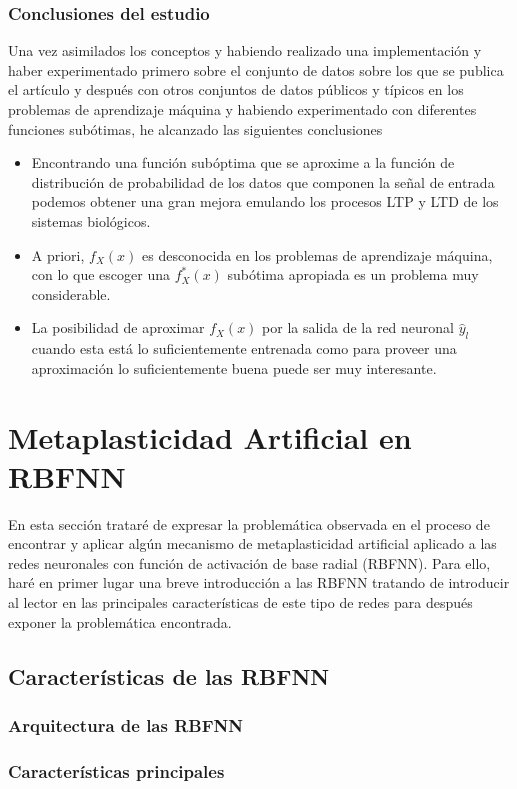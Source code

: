 \documentclass[10pt,a4paper]{report}
\begin{document}
\subsubsection{Conclusiones del estudio}
Una vez asimilados los conceptos y habiendo realizado una implementación y haber experimentado primero sobre el conjunto de datos sobre los que se publica el artículo y después con otros conjuntos de datos públicos y típicos en los problemas de aprendizaje máquina y habiendo experimentado con diferentes funciones subótimas, he alcanzado las siguientes conclusiones
\begin{itemize}
	\item Encontrando una función subóptima que se aproxime a la función de distribución de probabilidad de los datos que componen la señal de entrada podemos obtener una gran mejora emulando los procesos LTP y LTD de los sistemas biológicos.
	\item A priori, $f_X(x)$ es desconocida en los problemas de aprendizaje máquina, con lo que escoger una $f^*_X(x)$ subótima apropiada es un problema muy considerable.
	\item La posibilidad de aproximar $f_X(x)$ por la salida de la red neuronal $\widehat{y}_l$ cuando esta está lo suficientemente entrenada como para proveer una aproximación lo suficientemente buena puede ser muy interesante.
\end{itemize}

\section{Metaplasticidad Artificial en RBFNN}
En esta sección trataré de expresar la problemática observada en el proceso de encontrar y aplicar algún mecanismo de metaplasticidad artificial aplicado a las redes neuronales con función de activación de base radial (RBFNN). Para ello, haré en primer lugar una breve introducción a las RBFNN tratando de introducir al lector en las principales características de este tipo de redes para después exponer la problemática encontrada.
\subsection{Características de las RBFNN}
\subsubsection{Arquitectura de las RBFNN}
\subsubsection{Características principales}
\end{document}
